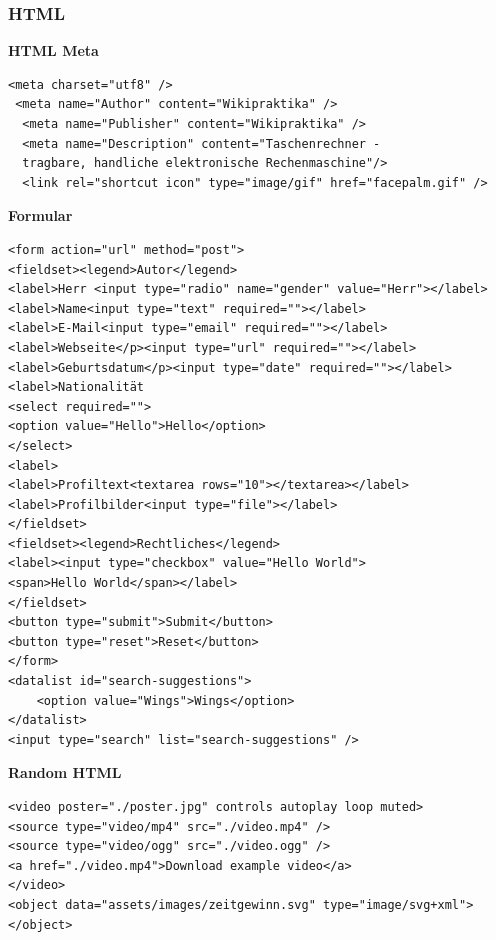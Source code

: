 

\thispagestyle{fancy}
\raggedright
\footnotesize
\raggedcolumns
\begin{multicols*}{4}
\setlength{\premulticols}{1pt}
\setlength{\postmulticols}{1pt}
\setlength{\multicolsep}{1pt}
\setlength{\columnsep}{2pt}
\tiny

\subsubsection{HTML}

\textbf{HTML Meta}
 \begin{verbatim}
<meta charset="utf­8" /> 
 <meta name="Author" content="Wikipraktika" />
  <meta name="Publisher" content="Wikipraktika" />
  <meta name="Description" content="Taschenrechner - 
  tragbare, handliche elektronische Rechenmaschine"/>
  <link rel="shortcut icon" type="image/gif" href="facepalm.gif" />
\end{verbatim}

\textbf{Formular}
 \begin{verbatim}
<form action="url" method="post">
<fieldset><legend>Autor</legend>
<label>Herr <input type="radio" name="gender" value="Herr"></label>
<label>Name<input type="text" required=""></label>
<label>E-Mail<input type="email" required=""></label>
<label>Webseite</p><input type="url" required=""></label>
<label>Geburtsdatum</p><input type="date" required=""></label>
<label>Nationalität
<select required="">
<option value="Hello">Hello</option>
</select>
<label>
<label>Profiltext<textarea rows="10"></textarea></label>
<label>Profilbilder<input type="file"></label>
</fieldset>
<fieldset><legend>Rechtliches</legend>
<label><input type="checkbox" value="Hello World">
<span>Hello World</span></label>
</fieldset>
<button type="submit">Submit</button>
<button type="reset">Reset</button>
</form>
<datalist id="search-suggestions">
	<option value="Wings">Wings</option>
</datalist>
<input type="search" list="search-suggestions" />
\end{verbatim}
\textbf{Random HTML}
 \begin{verbatim}
<video poster="./poster.jpg" controls autoplay loop muted>
<source type="video/mp4" src="./video.mp4" /> 
<source type="video/ogg" src="./video.ogg" /> 
<a href="./video.mp4">Download example video</a>
</video>
<object data="assets/images/zeitgewinn.svg" type="image/svg+xml"></object>
 \end{verbatim}


\end{multicols*}
